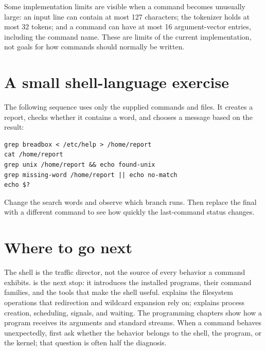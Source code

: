 Some implementation limits are visible when a command becomes unusually large: an input line can contain at most 127 characters; the tokenizer holds at most 32 tokens; and a command can have at most 16 argument-vector entries, including the command name. These are limits of the current implementation, not goals for how commands should normally be written.

\section{A small shell-language exercise}

The following sequence uses only the supplied commands and files. It creates a report, checks whether it contains a word, and chooses a message based on the result:

\begin{lstlisting}
grep breadbox < /etc/help > /home/report
cat /home/report
grep unix /home/report && echo found-unix
grep missing-word /home/report || echo no-match
echo $?
\end{lstlisting}

Change the search words and observe which branch runs. Then replace the final  with a different command to see how quickly the last-command status changes.

\section{Where to go next}

The shell is the traffic director, not the source of every behavior a command exhibits.  is the next stop: it introduces the installed programs, their command families, and the tools that make the shell useful.  explains the filesystem operations that redirection and wildcard expansion rely on;  explains process creation, scheduling, signals, and waiting. The programming chapters show how a program receives its arguments and standard streams. When a command behaves unexpectedly, first ask whether the behavior belongs to the shell, the program, or the kernel; that question is often half the diagnosis.
